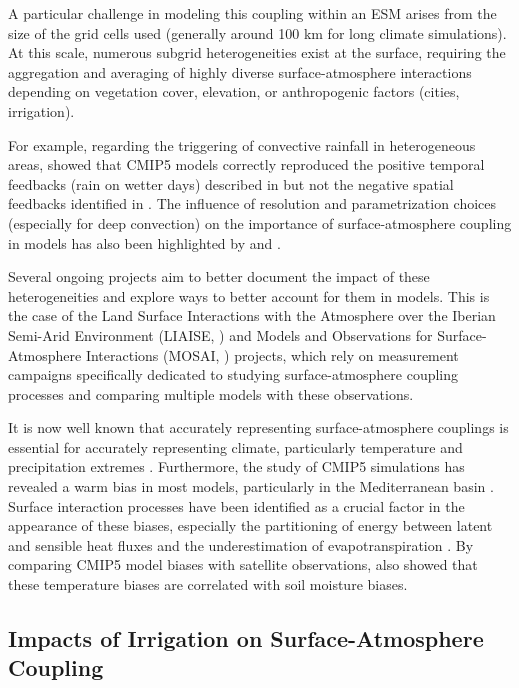 A particular challenge in modeling this coupling within an ESM arises from the size of the grid cells used (generally around 100 km for long climate simulations). At this scale, numerous subgrid heterogeneities exist at the surface, requiring the aggregation and averaging of highly diverse surface-atmosphere interactions depending on vegetation cover, elevation, or anthropogenic factors (cities, irrigation).

For example, regarding the triggering of convective rainfall in heterogeneous areas, \cite{moon_soil_2019} showed that CMIP5 models correctly reproduced the positive temporal feedbacks (rain on wetter days) described in \cite{guillod_reconciling_2015} but not the negative spatial feedbacks identified in \cite{taylor_afternoon_2012}. The influence of resolution and parametrization choices (especially for deep convection) on the importance of surface-atmosphere coupling in models has also been highlighted by \cite{tuinenburg_high-resolution_2020} and \cite{lee_weaker_2024}.

Several ongoing projects aim to better document the impact of these heterogeneities and explore ways to better account for them in models. This is the case of the Land Surface Interactions with the Atmosphere over the Iberian Semi-Arid Environment (LIAISE, \cite{boone_land_2019}) and Models and Observations for Surface-Atmosphere Interactions (MOSAI, \cite{lohou_model_2022}) projects, which rely on measurement campaigns specifically dedicated to studying surface-atmosphere coupling processes and comparing multiple models with these observations.

It is now well known that accurately representing surface-atmosphere couplings is essential for accurately representing climate, particularly temperature and precipitation extremes \citep{jaeger_impact_2011 van_den_hurk_acceleration_2011}. Furthermore, the study of CMIP5 simulations has revealed a warm bias in most models, particularly in the Mediterranean basin \cite{christensen_temperature_2012, mueller_systematic_2014}. Surface interaction processes have been identified as a crucial factor in the appearance of these biases, especially the partitioning of energy between latent and sensible heat fluxes and the underestimation of evapotranspiration \citep{cheruy_combined_2013, cheruy_role_2014}. By comparing CMIP5 model biases with satellite observations, \cite{al-yaari_satellite-based_2019} also showed that these temperature biases are correlated with soil moisture biases.

\subsection{Impacts of Irrigation on Surface-Atmosphere Coupling}

